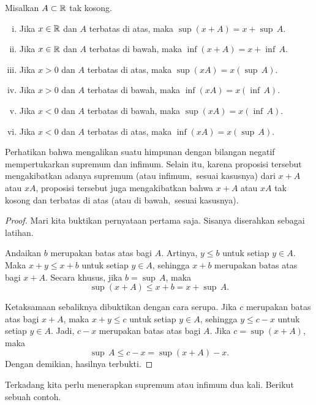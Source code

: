 \begin{prop} \label{prop:supinfalg}
Misalkan $A \subset {\mathbb{R}}$ tak kosong.
\begin{enumerate}[(i)]
\item Jika $x \in {\mathbb{R}}$ dan $A$ terbatas di atas, maka $\sup (x+A) = x + \sup\, A$.
\item Jika $x \in {\mathbb{R}}$ dan $A$ terbatas di bawah, maka $\inf (x+A) = x + \inf\, A$.
\item Jika $x > 0$ dan $A$ terbatas di atas, maka $\sup (xA) = x ( \sup\, A )$.
\item Jika $x > 0$ dan $A$ terbatas di bawah, maka $\inf (xA) = x ( \inf\, A )$.
\item Jika $x < 0$ dan $A$ terbatas di bawah, maka $\sup (xA) = x ( \inf\, A )$.
\item Jika $x < 0$ dan $A$ terbatas di atas, maka $\inf (xA) = x ( \sup\, A )$.
\end{enumerate}
\end{prop}

Perhatikan bahwa mengalikan suatu himpunan dengan bilangan negatif mempertukarkan supremum dan infimum.
Selain itu, karena proposisi tersebut mengakibatkan adanya
supremum (atau infimum,\ sesuai kasusnya) dari $x+A$ atau $xA$,
proposisi tersebut juga mengakibatkan bahwa $x+A$ atau $xA$
tak kosong dan terbatas di atas (atau di bawah,\ sesuai kasusnya).

\begin{proof}
Mari kita buktikan pernyataan pertama saja.  Sisanya diserahkan sebagai latihan.

Andaikan $b$ merupakan batas atas bagi $A$.  Artinya, $y \leq b$ untuk setiap $y \in A$.
Maka $x+y \leq x+b$ untuk setiap $y \in A$, sehingga $x+b$ merupakan batas
atas bagi $x+A$.  Secara khusus, jika $b = \sup\, A$, maka
\begin{equation*}
\sup (x+A) \leq x+b = x+ \sup\, A .
\end{equation*}

Ketaksamaan sebaliknya dibuktikan dengan cara serupa. Jika $c$ merupakan batas atas bagi $x+A$,
maka $x+y \leq c$
untuk setiap $y \in A$, sehingga $y \leq c-x$ untuk setiap $y \in A$.
Jadi, $c-x$ merupakan batas atas bagi $A$.
Jika $c = \sup (x+A)$, maka
\begin{equation*}
\sup\, A \leq c-x = \sup (x+A) -x .
\end{equation*}
Dengan demikian, hasilnya terbukti.
\end{proof}

Terkadang kita perlu menerapkan supremum atau infimum dua kali.  Berikut sebuah contoh.

